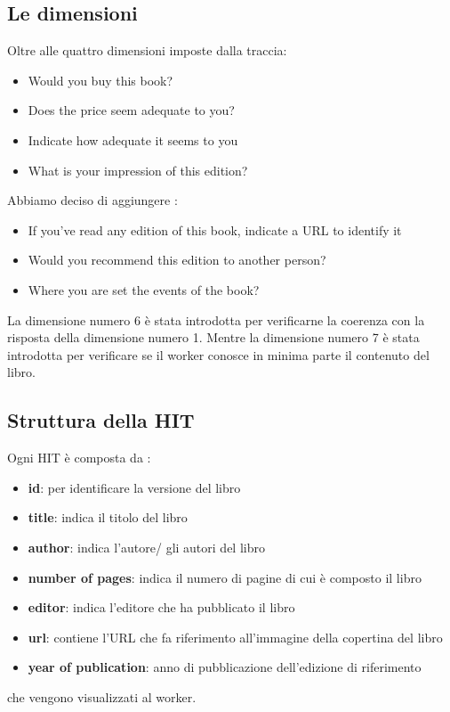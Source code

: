 \documentclass[a4paper,11pt]{report}
\begin{document}
\subsection{Le dimensioni}
Oltre alle quattro dimensioni imposte dalla traccia:
\begin{itemize}
	\item Would you buy this book?
	\item Does the price seem adequate to you?
	\item Indicate how adequate it seems to you
	\item What is your impression of this edition?
\end{itemize}
Abbiamo deciso di aggiungere :
\begin{itemize}
	\item If you've read any edition of this book, indicate a URL to identify it
	\item Would you recommend this edition to another person?
	\item Where you are set the events of the book?
\end{itemize}

La dimensione numero 6 è stata introdotta per verificarne la coerenza con la risposta della dimensione numero 1. Mentre la dimensione numero 7 è stata introdotta per verificare se il worker conosce in minima parte il contenuto del libro.

\subsection{Struttura della HIT}
Ogni HIT è composta da : 
\begin{itemize}
	\item \textbf{id}: per identificare la versione del libro
	\item \textbf{title}: indica il titolo del libro
	\item \textbf{author}: indica l'autore/ gli autori del libro
	\item \textbf{number of pages}: indica il numero di pagine di cui è composto il libro
	\item \textbf{editor}: indica l'editore che ha pubblicato il libro
	\item \textbf{url}: contiene l'URL che fa riferimento all'immagine della copertina del libro
	\item \textbf{year of publication}: anno di pubblicazione dell'edizione di riferimento
\end{itemize}
che vengono visualizzati al worker.
 \pagebreak
\end{document}
